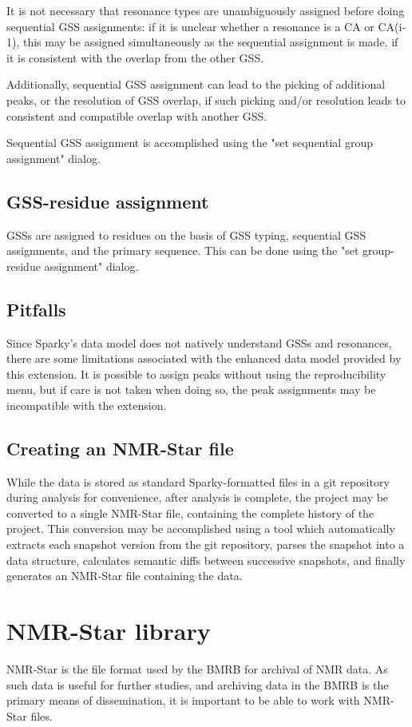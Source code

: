 It is not necessary that resonance types are unambiguously assigned before
doing sequential GSS assignments: if it is unclear whether a resonance is a
CA or CA(i-1), this may be assigned simultaneously as the sequential assignment
is made, if it is consistent with the overlap from the other GSS.

Additionally, sequential GSS assignment can lead to the picking of additional
peaks, or the resolution of GSS overlap, if such picking and/or resolution
leads to consistent and compatible overlap with another GSS.

Sequential GSS assignment is accomplished using the "set sequential group
assignment" dialog.

\subsection{GSS-residue assignment}
GSSs are assigned to residues on the basis of GSS typing, sequential GSS
assignments, and the primary sequence.
This can be done using the "set group-residue assignment" dialog.

\subsection{Pitfalls}
Since Sparky's data model does not natively understand GSSs and resonances,
there are some limitations associated with the enhanced data model provided
by this extension.  It is possible to assign peaks without using the 
reproducibility menu, but if care is not taken when doing so, the peak
assignments may be incompatible with the extension.

\subsection{Creating an NMR-Star file}
While the data is stored as standard Sparky-formatted files in a git repository
during analysis for convenience, after analysis is complete, the project
may be converted to a single NMR-Star file, containing the complete history
of the project.  This conversion may be accomplished using a tool which
automatically extracts each snapshot version from the git repository, 
parses the snapshot into a data structure,
calculates semantic diffs between successive snapshots, 
and finally generates an NMR-Star file containing the data.



\section{NMR-Star library}
NMR-Star is the file format used by the BMRB \cite{bmrb} for archival of
NMR data.  As such data is useful for further studies, and archiving
data in the BMRB is the primary means of dissemination, it is important
to be able to work with NMR-Star files.


